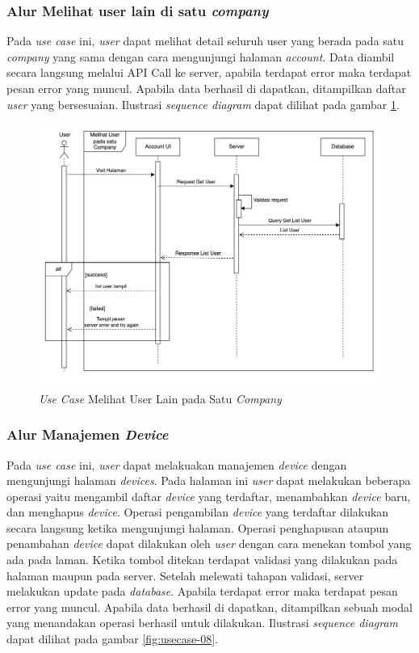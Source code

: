 \subsubsection{Alur Melihat user lain di satu \textit{company}}

Pada \textit{use case} ini, \textit{user} dapat melihat detail seluruh user yang berada pada satu \textit{company} yang sama dengan cara mengunjungi halaman \textit{account}. Data diambil secara langsung melalui API Call ke server, apabila terdapat error maka terdapat pesan error yang muncul. Apabila data berhasil di dapatkan, ditampilkan daftar \textit{user} yang bersesuaian. Ilustrasi \textit{sequence diagram} dapat dilihat pada gambar \ref{fig:usecase-07}.


\begin{figure}[ht]
  \centering
  \includegraphics[width=1\textwidth]{resources/chapter-3/usecase/uc-07.jpg}
  \caption{\textit{Use Case} Melihat User Lain pada Satu \textit{Company}}
  \label{fig:usecase-07}
\end{figure}

\pagebreak

\subsubsection{Alur Manajemen \textit{Device}}

Pada \textit{use case} ini, \textit{user} dapat melakuakan manajemen \textit{device} dengan mengunjungi halaman \textit{devices}. Pada halaman ini \textit{user} dapat melakukan beberapa operasi yaitu mengambil daftar \textit{device} yang terdaftar, menambahkan \textit{device} baru, dan menghapus \textit{device}. Operasi pengambilan \textit{device} yang terdaftar dilakukan secara langsung ketika mengunjungi halaman. Operasi penghapusan ataupun penambahan \textit{device} dapat dilakukan oleh \textit{user} dengan cara menekan tombol yang ada pada laman. Ketika tombol ditekan terdapat validasi yang dilakukan pada halaman maupun pada server. Setelah melewati tahapan validasi, server melakukan update pada \textit{database}. Apabila terdapat error maka terdapat pesan error yang muncul. Apabila data berhasil di dapatkan, ditampilkan sebuah modal yang menandakan operasi berhasil untuk dilakukan. Ilustrasi \textit{sequence diagram} dapat dilihat pada gambar \ref{fig:usecase-08}.


